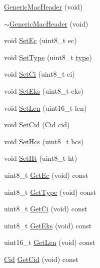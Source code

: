 \begin{DoxyCompactItemize}
\item 
\hyperlink{classns3_1_1GenericMacHeader_ae0d4b6252a62ecc007a5410ec7ea7cd7}{Generic\+Mac\+Header} (void)
\item 
\hyperlink{classns3_1_1GenericMacHeader_a59cc5885f6d027996ba2f8245e4b303f}{$\sim$\+Generic\+Mac\+Header} (void)
\item 
void \hyperlink{classns3_1_1GenericMacHeader_a28f2c0d7310da15868a763744fffa87e}{Set\+Ec} (uint8\+\_\+t ec)
\item 
void \hyperlink{classns3_1_1GenericMacHeader_a5d9f587449b5a20b99b29f9000a36a6c}{Set\+Type} (uint8\+\_\+t \hyperlink{visualizer-ideas_8txt_add98db9e15e2a58cf2b57623e7aa893a}{type})
\item 
void \hyperlink{classns3_1_1GenericMacHeader_adbdc440b8e835a13bc26a16c20556722}{Set\+Ci} (uint8\+\_\+t ci)
\item 
void \hyperlink{classns3_1_1GenericMacHeader_abb4ce1f9cc59343e657b39ed26c10214}{Set\+Eks} (uint8\+\_\+t eks)
\item 
void \hyperlink{classns3_1_1GenericMacHeader_ad0b87b780d222778c78b783f7f4e5237}{Set\+Len} (uint16\+\_\+t len)
\item 
void \hyperlink{classns3_1_1GenericMacHeader_adb74c3c234787de22682103cba562d83}{Set\+Cid} (\hyperlink{classns3_1_1Cid}{Cid} cid)
\item 
void \hyperlink{classns3_1_1GenericMacHeader_a1e3b715fdb24fc6b68c77fbf43439a2d}{Set\+Hcs} (uint8\+\_\+t hcs)
\item 
void \hyperlink{classns3_1_1GenericMacHeader_a729ced94a83c182fde358bcefefe540a}{Set\+Ht} (uint8\+\_\+t ht)
\item 
uint8\+\_\+t \hyperlink{classns3_1_1GenericMacHeader_a8b41bceb565d7278f04f5fc332fc9dff}{Get\+Ec} (void) const 
\item 
uint8\+\_\+t \hyperlink{classns3_1_1GenericMacHeader_aa0145e7dc78803c1193edb55307bb1a4}{Get\+Type} (void) const 
\item 
uint8\+\_\+t \hyperlink{classns3_1_1GenericMacHeader_a8044db7fddc4ec4c9f9f52f1e420346b}{Get\+Ci} (void) const 
\item 
uint8\+\_\+t \hyperlink{classns3_1_1GenericMacHeader_a355fd119298b7dbfc6da0430f54c42f9}{Get\+Eks} (void) const 
\item 
uint16\+\_\+t \hyperlink{classns3_1_1GenericMacHeader_ab9f1544374d695618bfa977f64879759}{Get\+Len} (void) const 
\item 
\hyperlink{classns3_1_1Cid}{Cid} \hyperlink{classns3_1_1GenericMacHeader_a99fae1be3fd61a524a49bcd86d384fac}{Get\+Cid} (void) const 

\end{DoxyCompactItemize}
